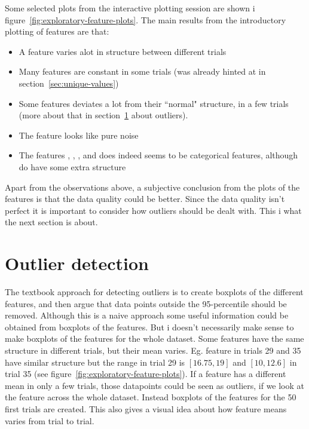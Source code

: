 Some selected plots from the interactive plotting session are shown i figure~\ref{fig:exploratory-feature-plots}. The main results from the introductory plotting of features are that: 
\begin{itemize}
    \item A feature varies alot in structure between different trials
    \item Many features are constant in some trials (was already hinted at in section~\ref{sec:unique-values})
    \item Some features deviates a lot from their ``normal" structure, in a few trials (more about that in section~\ref{sec:outlier-detection} about outliers).
    \item The feature  looks like pure noise
    \item The features , , ,  and  does indeed seems to be categorical features, although  do have some extra structure
\end{itemize}
Apart from the observations above, a subjective conclusion from the plots of the features is that the data quality could be better. Since the data quality isn't perfect it is important to consider how outliers should be dealt with. This i what the next section is about.


\section{Outlier detection}\label{sec:outlier-detection}
The textbook approach for detecting outliers is to create boxplots of the different features, and then argue that data points outside the 95-percentile should be removed. Although this is a naive approach some useful information could be obtained from boxplots of the features. But i doesn't necessarily make sense to make boxplots of the features for the whole dataset. Some features have the same structure in different trials, but their mean varies. Eg. feature  in trials 29 and 35 have similar structure but the range in trial 29 is $[16.75, 19]$ and $[10,12.6]$ in trial 35 (see figure~\ref{fig:exploratory-feature-plots}). If a feature has a different mean in only a few trials, those datapoints could be seen as outliers, if we look at the feature across the whole dataset. Instead boxplots of the features for the 50 first trials are created. This also gives a visual idea about how feature means varies from trial to trial. 
